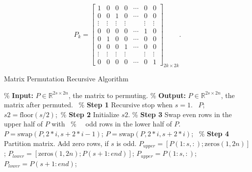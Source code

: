 \documentclass{book}
\theoremstyle{remark}
\begin{document}
\begin{multicols}{2}
\begin{equation}\label{p}
    P_k = \begin{bmatrix} 
            1 & 0 & 0 & 0 & \cdots & 0 & 0\\ 
            0 & 0 & 1 & 0 & \cdots & 0 & 0\\ 
            \vdots & \vdots & \vdots & \vdots &  & \vdots & \vdots\\ 
            0 & 0 & 0 & 0 & \cdots & 1 & 0 \\
            0 & 1 & 0 & 0 & \cdots & 0 & 0\\ 
            0 & 0 & 0 & 1 & \cdots & 0 & 0\\ 
            \vdots & \vdots & \vdots & \vdots &  & \vdots & \vdots\\ 
            0 & 0 & 0 & 0 &\cdots & 0 & 1 
        \end{bmatrix}_{2k \times 2k}.
\end{equation}


\begin{algorithm}[htbp]
    \caption{Matrix Permutation Recursive Algorithm} \label{alg:Permutation}
    \begin{algorithmic}[1]
        \State \% \textbf{Input:} $P \in \mathbb{R}^{2s \times 2n}$, the matrix to permuting.
        \State \% \textbf{Output:} $P \in \mathbb{R}^{2s \times 2n}$, the matrix after permuted.
         \qquad\qquad\qquad\qquad\qquad\qquad\qquad\qquad \ \% \textbf{Step 1} Recursive stop when $s=1$.
            \State \Return \ $P$;
        \End 
        \State $s2 = \text{floor}(s/2)$;\qquad\qquad\qquad\qquad\qquad\qquad\quad \ \% \textbf{Step 2} Initialize $s2$.
         \qquad\qquad\qquad\qquad\qquad\qquad\qquad\% \textbf{Step 3} Swap even rows in the upper half of $P$ with
             \qquad\qquad\qquad\qquad\qquad\quad \ \% \qquad\quad\ \  odd rows in the lower half of $P$.
                \State $P= \text{swap}(P,2*i,s+2*i-1)$;
            \Else
                \State $P= \text{swap}(P,2*i,s+2*i)$;
            \End
        \End
         \qquad\qquad\qquad\qquad\qquad\qquad\ \% \textbf{Step 4} Partition matrix. Add zero rows, if $s$ is odd.
            \State $P_{upper} = [P(1:s,:); \text{zeros}(1, 2n)]$;
            \State $P_{lower} = [\text{zeros}(1, 2n); P(s+1:end)]$;
        \Else
            \State $P_{upper} = P(1:s,:)$;
            \State $P_{lower} = P(s+1:end)$;
        \End
        

\end{algorithmic}
\end{algorithm}
\end{multicols}
\end{document}
